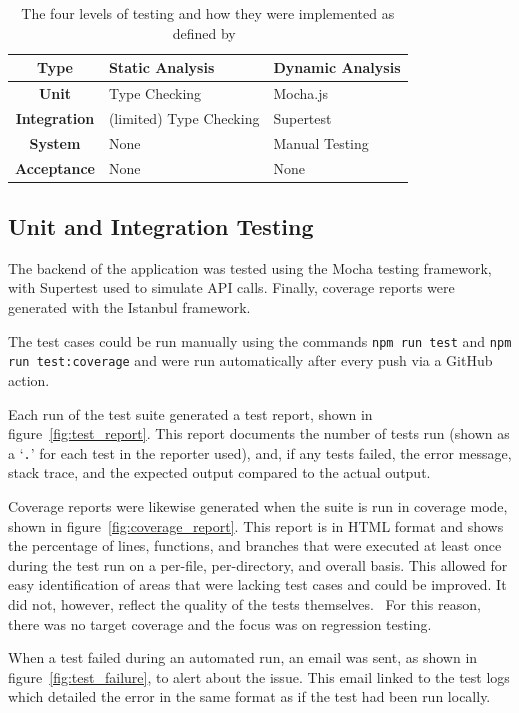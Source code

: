 \begin{table}[hp]
    \centering
    \caption{\label{tab:test_types}The four levels of testing and how they were implemented as defined by~\cite{luo_software_2001}}
    \begin{tabular}{cll}\toprule
        \textbf{Type} & \textbf{Static Analysis} & \textbf{Dynamic Analysis} \\\midrule
        \textbf{Unit} & Type Checking & Mocha.js \\
        \textbf{Integration} & (limited) Type Checking & Supertest \\
        \textbf{System} & None & Manual Testing \\
        \textbf{Acceptance} & None & None \\
        \bottomrule
    \end{tabular}
\end{table}

\subsection{Unit and Integration Testing}
The backend of the application was tested using the Mocha testing framework, with Supertest
used to simulate API calls. Finally, coverage reports were generated with the Istanbul framework.

The test cases could be run manually using the commands \texttt{npm run test} and \texttt{npm run test:coverage}
and were run automatically after every push via a GitHub action.

Each run of the test suite generated a test report, shown in figure~\ref{fig:test_report}. This report
documents the number of tests run (shown as a \enquote*{\texttt{.}} for each test in the reporter used),
and, if any tests failed, the error message, stack trace, and the expected output compared to the actual output.

Coverage reports were likewise generated when the suite is run in coverage mode, shown in figure~\ref{fig:coverage_report}.
This report is in HTML format and shows the percentage of lines, functions, and branches that were executed at least once
during the test run on a per-file, per-directory, and overall basis. This allowed for easy identification of areas that
were lacking test cases and could be improved. It did not, however, reflect the quality of the tests themselves.~\cite{meyer_is_2012}
For this reason, there was no target coverage and the focus was on regression testing.

When a test failed during an automated run, an email was sent, as shown in figure~\ref{fig:test_failure}, to alert
about the issue. This email linked to the test logs which detailed the error in the same format as if the test had been run
locally.

